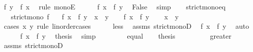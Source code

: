 \begin{isabellebody}
\ {\isachardoublequoteopen}f\ y\ {\isasymle}\ f\ x{\isachardoublequoteclose}\ \isamarkupfalse%
\ {\isacharparenleft}{\kern0pt}rule\ monoE{\isacharparenright}{\kern0pt}\isanewline
\ \ \ \ \isamarkupfalse%
\ {\isacartoucheopen}f\ x\ {\isacharless}{\kern0pt}\ f\ y{\isacartoucheclose}\ \isamarkupfalse%
\ False\ \isamarkupfalse%
\ simp\isanewline
\ \ \isamarkupfalse%
\isanewline
{}\isamarkupfalse%
%
\endisatagproof
{\isafoldproof}%
%
\isadelimproof
\isanewline
%
\endisadelimproof
\isanewline
{}\isamarkupfalse%
\ strict{\isacharunderscore}{\kern0pt}mono{\isacharunderscore}{\kern0pt}eq{\isacharcolon}{\kern0pt}\isanewline
\ \ \ {\isachardoublequoteopen}strict{\isacharunderscore}{\kern0pt}mono\ f{\isachardoublequoteclose}\isanewline
\ \ \ {\isachardoublequoteopen}f\ x\ {\isacharequal}{\kern0pt}\ f\ y\ {\isasymlongleftrightarrow}\ x\ {\isacharequal}{\kern0pt}\ y{\isachardoublequoteclose}\isanewline
%
\isadelimproof
%
\endisadelimproof
%
\isatagproof
{}\isamarkupfalse%
\isanewline
\ \ \isamarkupfalse%
\ {\isachardoublequoteopen}f\ x\ {\isacharequal}{\kern0pt}\ f\ y{\isachardoublequoteclose}\isanewline
\ \ \isamarkupfalse%
\ {\isachardoublequoteopen}x\ {\isacharequal}{\kern0pt}\ y{\isachardoublequoteclose}\ \isamarkupfalse%
\ {\isacharparenleft}{\kern0pt}cases\ x\ y\ rule{\isacharcolon}{\kern0pt}\ linorder{\isacharunderscore}{\kern0pt}cases{\isacharparenright}{\kern0pt}\isanewline
\ \ \ \ \isamarkupfalse%
\ less\ \isamarkupfalse%
\ assms\ strict{\isacharunderscore}{\kern0pt}monoD\ \isamarkupfalse%
\ {\isachardoublequoteopen}f\ x\ {\isacharless}{\kern0pt}\ f\ y{\isachardoublequoteclose}\ \isamarkupfalse%
\ auto\isanewline
\ \ \ \ \isamarkupfalse%
\ {\isacartoucheopen}f\ x\ {\isacharequal}{\kern0pt}\ f\ y{\isacartoucheclose}\ \isamarkupfalse%
\ {\isacharquery}{\kern0pt}thesis\ \isamarkupfalse%
\ simp\isanewline
\ \ \isamarkupfalse%
\isanewline
\ \ \ \ \isamarkupfalse%
\ equal\ \isamarkupfalse%
\ \isamarkupfalse%
\ {\isacharquery}{\kern0pt}thesis\ \isacommand{{\isachardot}{\kern0pt}}\isamarkupfalse%
\isanewline
\ \ \isamarkupfalse%
\isanewline
\ \ \ \ \isamarkupfalse%
\ greater\ \isamarkupfalse%
\ assms\ strict{\isacharunderscore}{\kern0pt}monoD\ \isamarkupfalse%

\end{isabellebody}

